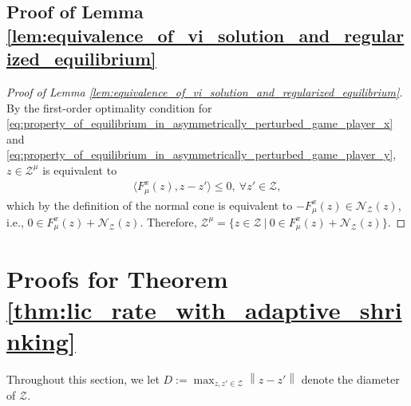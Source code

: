 \documentclass{article}
\newcommand{\Z}{\mathcal{Z}}
\theoremstyle{plain}
\begin{document}
\subsection{Proof of Lemma \ref{lem:equivalence_of_vi_solution_and_regularized_equilibrium}}
\begin{proof}[Proof of Lemma \ref{lem:equivalence_of_vi_solution_and_regularized_equilibrium}]
    By the first-order optimality condition for \eqref{eq:property_of_equilibrium_in_asymmetrically_perturbed_game_player_x} and \eqref{eq:property_of_equilibrium_in_asymmetrically_perturbed_game_player_y}, $z\in \Z^{\mu}$ is equivalent to
    \begin{align*}
        \langle F_{\mu}^x(z), z - z'\rangle \leq 0, ~ \forall z'\in \Z,
    \end{align*}
    which by the definition of the normal cone is equivalent to $-F_{\mu}^x(z) \in \mathcal{N}_{\Z}(z)$, i.e., $0 \in F_{\mu}^x(z) + \mathcal{N}_{\Z}(z)$.
    Therefore, $\Z^{\mu} = \{z\in \Z ~|~ 0\in F_{\mu}^x(z) + \mathcal{N}_{\Z}(z)\}$.
\end{proof}


\section{Proofs for Theorem \ref{thm:lic_rate_with_adaptive_shrinking}}
Throughout this section, we let $D := \max_{z, z'\in \Z}\left\|z - z'\right\|$ denote the diameter of $\Z$.
\end{document}
